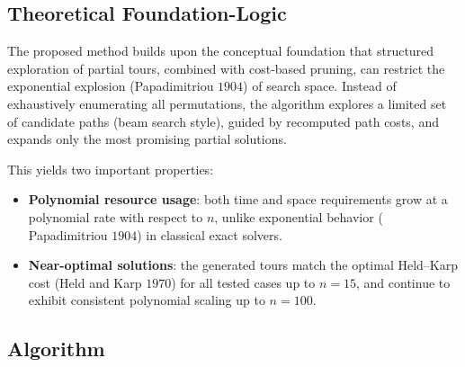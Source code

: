 \documentclass[sn-mathphys]{article}
\theoremstyle{thmstyleone}%
\theoremstyle{thmstyletwo}%
\theoremstyle{thmstylethree}%
\begin{document}
\subsection{Theoretical Foundation-Logic}

The proposed method builds upon the conceptual foundation that structured 
exploration of partial tours, combined with cost-based pruning, 
can restrict the exponential explosion (Papadimitriou $1904$) of search space. 
Instead of exhaustively enumerating all permutations, 
the algorithm explores a limited set of candidate paths 
(beam search style), guided by recomputed path costs, 
and expands only the most promising partial solutions.

This yields two important properties:
\begin{itemize}
    \item \textbf{Polynomial resource usage}: 
    both time and space requirements grow at a polynomial rate with respect to $n$, 
    unlike exponential behavior ( Papadimitriou $1904$) in classical exact solvers.
    \item \textbf{Near-optimal solutions}: 
    the generated tours match the optimal Held--Karp cost (Held and Karp $1970$) for all tested cases up to $n=15$, 
    and continue to exhibit consistent polynomial scaling up to $n=100$.
\end{itemize}

\subsection{Algorithm}
\end{document}
